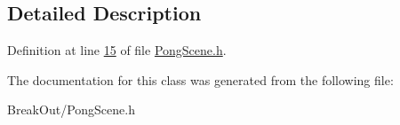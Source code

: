 \subsection{Detailed Description}


Definition at line \hyperlink{_pong_scene_8h_source_l00015}{15} of file \hyperlink{_pong_scene_8h_source}{Pong\-Scene.\-h}.



The documentation for this class was generated from the following file\-:\begin{DoxyCompactItemize}
\item 
Break\-Out/Pong\-Scene.\-h\end{DoxyCompactItemize}
